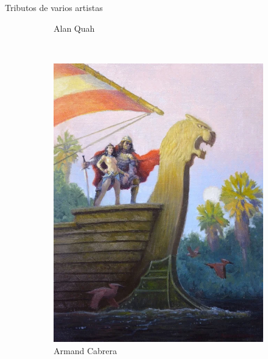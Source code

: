\begin{frame}{Tributos de varios artistas}
\begin{figure}[htp]
\begin{subfigure}[b]{0.22\textwidth}
			\caption{Alan Quah}
		\end{subfigure}
		~
		\begin{subfigure}[b]{0.22\textwidth}
			\includegraphics[width=\textwidth]{img/tributos/ArmandCabrera}
			\caption{Armand Cabrera}
		\end{subfigure}
		~
		\begin{subfigure}[b]{0.22\textwidth}

\end{subfigure}
\end{figure}
\end{frame}

